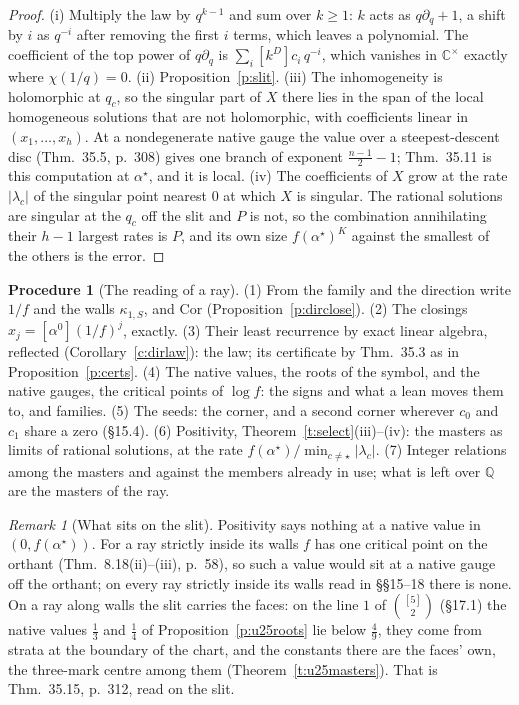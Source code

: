\documentclass[11pt]{article}
\theoremstyle{plain}
\theoremstyle{definition}
\newtheorem{procedure}[proposition]{Procedure}
\theoremstyle{remark}
\newtheorem{remark}[proposition]{Remark}
\begin{document}
\begin{proof}
(i) Multiply the law by $q^{k-1}$ and sum over $k\ge1$: $k$ acts as $q\partial_q+1$, a shift by $i$ as $q^{-i}$ after removing the first $i$ terms, which leaves a polynomial. The coefficient of the top power of $q\partial_q$ is $\sum_i[k^D]c_i\,q^{-i}$, which vanishes in $\mathbb C^\times$ exactly where $\chi(1/q)=0$. (ii) Proposition~\ref{p:slit}. (iii) The inhomogeneity is holomorphic at $q_c$, so the singular part of $X$ there lies in the span of the local homogeneous solutions that are not holomorphic, with coefficients linear in $(x_1,\dots,x_h)$. At a nondegenerate native gauge the value over a steepest-descent disc (Thm.~35.5, p.~308) gives one branch of exponent $\frac{n-1}2-1$; Thm.~35.11 is this computation at $\alpha^\star$, and it is local. (iv) The coefficients of $X$ grow at the rate $|\lambda_c|$ of the singular point nearest $0$ at which $X$ is singular. The rational solutions are singular at the $q_c$ off the slit and $P$ is not, so the combination annihilating their $h-1$ largest rates is $P$, and its own size $f(\alpha^\star)^K$ against the smallest of the others is the error.
\end{proof}

\begin{procedure}[The reading of a ray]\label{p:reading}
(1) From the family and the direction write $1/f$ and the walls $\kappa_{1,S}$, and $\mathrm{Cor}$ (Proposition~\ref{p:dirclose}). (2) The closings $x_j=[\alpha^0](1/f)^j$, exactly. (3) Their least recurrence by exact linear algebra, reflected (Corollary~\ref{c:dirlaw}): the law; its certificate by Thm.~35.3 as in Proposition~\ref{p:certs}. (4) The native values, the roots of the symbol, and the native gauges, the critical points of $\log f$: the signs and what a lean moves them to, and families. (5) The seeds: the corner, and a second corner wherever $c_0$ and $c_1$ share a zero (\S15.4). (6) Positivity, Theorem~\ref{t:select}(iii)--(iv): the masters as limits of rational solutions, at the rate $f(\alpha^\star)/\min_{c\ne\star}|\lambda_c|$. (7) Integer relations among the masters and against the members already in use; what is left over $\mathbb Q$ are the masters of the ray.
\end{procedure}

\begin{remark}[What sits on the slit]\label{r:onslit}
Positivity says nothing at a native value in $(0,f(\alpha^\star))$. For a ray strictly inside its walls $f$ has one critical point on the orthant (Thm.~8.18(ii)--(iii), p.~58), so such a value would sit at a native gauge off the orthant; on every ray strictly inside its walls read in \S\S15--18 there is none. On a ray along walls the slit carries the faces: on the line $1$ of $\binom{[5]}2$ (\S17.1) the native values $\frac13$ and $\frac14$ of Proposition~\ref{p:u25roots} lie below $\frac49$, they come from strata at the boundary of the chart, and the constants there are the faces' own, the three-mark centre among them (Theorem~\ref{t:u25masters}). That is Thm.~35.15, p.~312, read on the slit.
\end{remark}
\end{document}
